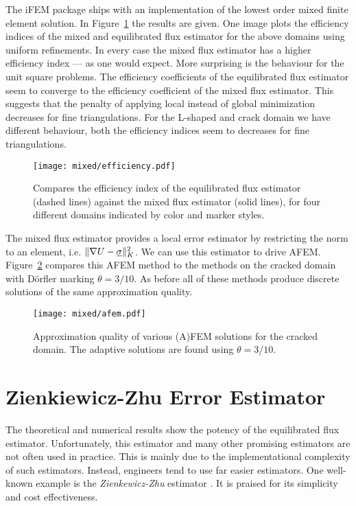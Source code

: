 \documentclass[thesis.tex]{subfiles}
\begin{document}
The iFEM package ships with an implementation of the lowest order mixed finite element solution. In Figure~\ref{fig:effmixed} the results are given.
One image plots the efficiency indices of the mixed and equilibrated flux estimator
for the above domains using uniform refinements. In every case the mixed flux estimator has a higher efficiency index  --- as one would expect. 
More surprising is the behaviour for the unit square problems. The efficiency coefficients of the equilibrated flux estimator
seem to  converge to the efficiency coefficient of the mixed flux estimator. This suggests that the penalty of applying
local instead of global minimization decreases for fine triangulations. For the L-shaped and crack domain we have different behaviour,
both the efficiency indices seem to decreases for fine triangulations. 
\begin{figure}
  \centering
  \texttt{[image: mixed/efficiency.pdf]}
  \caption{
    Compares the efficiency index of the equilibrated flux estimator (dashed lines) against the mixed flux estimator (solid lines), for
  four different domains indicated by color and marker styles.}
  \label{fig:effmixed}
\end{figure}

The mixed flux estimator provides a local error estimator by restricting the norm to an element, i.e. $\| \nabla U - \underline{\sigma} \|^2_K$. We
can use this estimator to drive AFEM. Figure~\ref{fig:afemmixed} compares this AFEM method to the methods on the cracked domain with D\"orfler marking $\theta = 3/10$. 
As before all of these methods produce discrete solutions of the same approximation quality. 
\begin{figure}
  \centering
  \texttt{[image: mixed/afem.pdf]}
  \caption{
    Approximation quality of various (A)FEM solutions for the cracked domain. The adaptive solutions are found using $\theta = 3/10$.
  }
  \label{fig:afemmixed}
\end{figure}
\section{Zienkiewicz-Zhu Error Estimator}
The theoretical and numerical results show the potency of the equilibrated flux estimator. Unfortunately, this estimator and many other promising
estimators are not often used in practice. This is mainly due to the implementational complexity of such estimators.
Instead, engineers tend to use far easier estimators. One well-known example is the \emph{Zienkewicz-Zhu} estimator 
\cite{zienkiewicz1987simple, zienkiewicz1992superconvergent}. It is praised for its simplicity and cost effectiveness.
\end{document}
